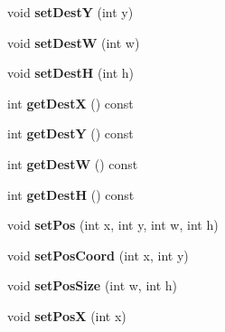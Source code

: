 \begin{DoxyCompactItemize}
\item 
void {\bfseries set\+DestY} (int y)\hypertarget{classObject_aa93897917882b2676c12508367c80868}{}\label{classObject_aa93897917882b2676c12508367c80868}

\item 
void {\bfseries set\+DestW} (int w)\hypertarget{classObject_a1ec31ddc68cf6bf36a32c310f888b7de}{}\label{classObject_a1ec31ddc68cf6bf36a32c310f888b7de}

\item 
void {\bfseries set\+DestH} (int h)\hypertarget{classObject_a80a3703cd45991b6cf7ee84015e66666}{}\label{classObject_a80a3703cd45991b6cf7ee84015e66666}

\item 
int {\bfseries get\+DestX} () const \hypertarget{classObject_a676f44b728a130def5d481207b5207e0}{}\label{classObject_a676f44b728a130def5d481207b5207e0}

\item 
int {\bfseries get\+DestY} () const \hypertarget{classObject_a8360464ae4ca310dfade7e6177c0a62c}{}\label{classObject_a8360464ae4ca310dfade7e6177c0a62c}

\item 
int {\bfseries get\+DestW} () const \hypertarget{classObject_aba27e7c500253460648e8cf346f6d1ac}{}\label{classObject_aba27e7c500253460648e8cf346f6d1ac}

\item 
int {\bfseries get\+DestH} () const \hypertarget{classObject_a3c47c2d19a0173d0db7d5b855908a0c7}{}\label{classObject_a3c47c2d19a0173d0db7d5b855908a0c7}

\item 
void {\bfseries set\+Pos} (int x, int y, int w, int h)\hypertarget{classObject_a41afdccb37a804853d9d8704ed4a3b9b}{}\label{classObject_a41afdccb37a804853d9d8704ed4a3b9b}

\item 
void {\bfseries set\+Pos\+Coord} (int x, int y)\hypertarget{classObject_a494e9ca36ba11fa9f09de7f96711cee7}{}\label{classObject_a494e9ca36ba11fa9f09de7f96711cee7}

\item 
void {\bfseries set\+Pos\+Size} (int w, int h)\hypertarget{classObject_af35cb0478e83025206b9b87780ff9ba7}{}\label{classObject_af35cb0478e83025206b9b87780ff9ba7}

\item 
void {\bfseries set\+PosX} (int x)\hypertarget{classObject_ac419339f2d1173f39f355b7d8ccd1715}{}\label{classObject_ac419339f2d1173f39f355b7d8ccd1715}


\end{DoxyCompactItemize}
